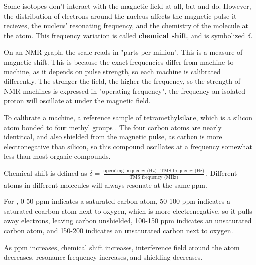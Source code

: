 \documentclass{article}
\begin{document}
Some isotopes don't interact with the magnetic field at all, but  and  do. However, the distribution of electrons around the nucleus affects the magnetic pulse it recieves, the nucleus' resonating frequency, and the chemistry of the molecule at the atom. This frequency variation is called \textbf{chemical shift}, and is symbolized $\delta$.

On an NMR graph, the scale reads in "parts per million". This is a measure of magnetic shift. This is because the exact frequencies differ from machine to machine, as it depends on pulse strength, so each machine is calibrated differently. The stronger the field, the higher the frequency, so the strength of NMR machines is expressed in "operating frequency", the frequency an isolated proton will oscillate at under the magnetic field.

To calibrate a machine, a reference sample of tetramethylsilane, which is a silicon atom bonded to four methyl groups . The four carbon atoms are nearly identitcal, and also shielded from the magnetic pulse, as carbon is more electronegative than silicon, so this compound oscillates at a frequency somewhat less than most organic compounds. 

Chemical shift is defined as $\delta = \frac{\text{operating frequency (Hz)} - \text{TMS frequency (Hz)}}{\text{TMS frequency (MHz)}}$. Different atoms in different molecules will always resonate at the same ppm. 

For , 0-50 ppm indicates a saturated carbon atom, 50-100 ppm indicates a saturated coarbon atom next to oxygen, which is more electronegative, so it pulls away electrons, leaving carbon unshielded, 100-150 ppm indicates an unsaturated carbon atom, and 150-200 indicates an unsaturated carbon next to oxygen. 

As ppm increases, chemical shift increases, interference field around the atom decreases, resonance frequency increases, and shielding decreases. 
\end{document}
